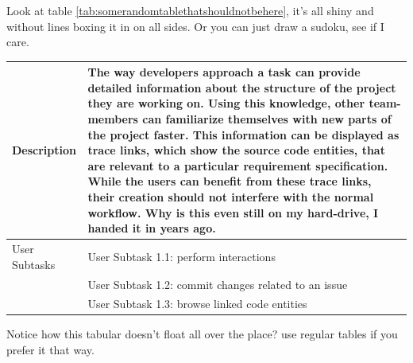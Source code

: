 Look at table \ref{tab:somerandomtablethatshouldnotbehere}, it's all shiny and without lines boxing it in on all sides. Or you can just draw a sudoku, see if I care.


\begin{center}
\begin{tabular}{ p{}  p{ }}

	Description & The way developers approach a task can provide detailed information about the structure of the project they are working on.
	Using this knowledge, other team-members can familiarize themselves with new parts of the project faster.
	This information can be displayed as trace links, which show the source code entities, that are relevant to a particular requirement specification.
	While the users can benefit from these trace links, their creation should not interfere with the normal workflow. Why is this even still on my hard-drive, I handed it in years ago.\\
	\hline
	User Subtasks & User Subtask 1.1: perform interactions\\
	& User Subtask 1.2: commit changes related to an issue\\
	& User Subtask 1.3: browse linked code entities\\	
\end{tabular}
	\label{tab:somerandomtablethatshouldnotbehere}
\end{center}

Notice how this tabular doesn't float all over the place? use regular tables if you prefer it that way.
